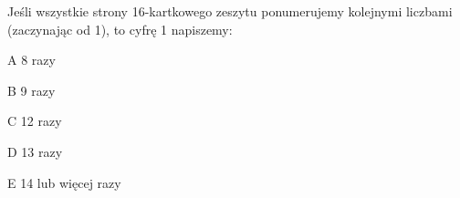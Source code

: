 \begin{tresc}
Jeśli wszystkie strony 16-kartkowego zeszytu ponumerujemy kolejnymi liczbami (zaczynając od 1), to cyfrę 1 napiszemy:
\end{tresc}
\begin{wariant}{A} 8 razy \end{wariant}
\begin{wariant}{B} 9 razy \end{wariant}
\begin{wariant}{C} 12 razy \end{wariant}
\begin{wariant}{D} 13 razy \end{wariant}
\begin{wariant}{E} 14 lub więcej razy \end{wariant}
